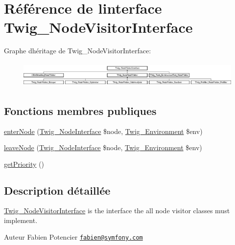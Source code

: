 \hypertarget{interface_twig___node_visitor_interface}{}\section{Référence de l\textquotesingle{}interface Twig\+\_\+\+Node\+Visitor\+Interface}
\label{interface_twig___node_visitor_interface}
Graphe d\textquotesingle{}héritage de Twig\+\_\+\+Node\+Visitor\+Interface\+:\begin{figure}[H]
\begin{center}
\leavevmode
\includegraphics[height=1.317647cm]{interface_twig___node_visitor_interface}
\end{center}
\end{figure}
\subsection*{Fonctions membres publiques}
\begin{DoxyCompactItemize}
\item 
\hyperlink{interface_twig___node_visitor_interface_ad3bfee38f2bc56df9500da7f20b6e13a}{enter\+Node} (\hyperlink{interface_twig___node_interface}{Twig\+\_\+\+Node\+Interface} \$node, \hyperlink{class_twig___environment}{Twig\+\_\+\+Environment} \$env)
\item 
\hyperlink{interface_twig___node_visitor_interface_a436bb1ae16511148e860e5cfa2cad88f}{leave\+Node} (\hyperlink{interface_twig___node_interface}{Twig\+\_\+\+Node\+Interface} \$node, \hyperlink{class_twig___environment}{Twig\+\_\+\+Environment} \$env)
\item 
\hyperlink{interface_twig___node_visitor_interface_a1e7a3c168dcd0901a0d2669c67575b55}{get\+Priority} ()
\end{DoxyCompactItemize}


\subsection{Description détaillée}
\hyperlink{interface_twig___node_visitor_interface}{Twig\+\_\+\+Node\+Visitor\+Interface} is the interface the all node visitor classes must implement.

\begin{DoxyAuthor}{Auteur}
Fabien Potencier \href{mailto:fabien@symfony.com}{\tt fabien@symfony.\+com} 
\end{DoxyAuthor}


